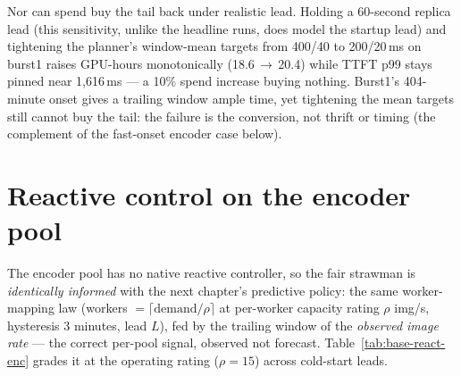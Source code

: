 Nor can spend buy the tail back under realistic lead. Holding a 60-second
replica lead (this sensitivity, unlike the headline runs, does model the
startup lead) and tightening the planner's window-mean targets from
400/40 to 200/20\,\si{\milli\second} on burst1 raises GPU-hours
monotonically (18.6\,$\to$\,20.4) while TTFT p99 stays pinned near
1{,}616\,\si{\milli\second} --- a 10\% spend increase buying nothing.
Burst1's 404-minute onset gives a trailing window ample time, yet
tightening the mean targets still cannot buy the tail: the failure is the
conversion, not thrift or timing (the complement of the fast-onset
encoder case below).

\section{Reactive control on the encoder pool}
\label{sec:base-reactive-enc}

The encoder pool has no native reactive controller, so the fair strawman
is \emph{identically informed} with the next chapter's predictive policy:
the same worker-mapping law (workers $= \lceil \text{demand} / \rho
\rceil$ at per-worker capacity rating $\rho$ \si{img/s}, hysteresis 3
minutes, lead $L$), fed by the trailing window of the \emph{observed
image rate} --- the correct per-pool signal, observed not forecast.
Table~\ref{tab:base-react-enc} grades it at the operating rating
($\rho{=}15$) across cold-start leads.

